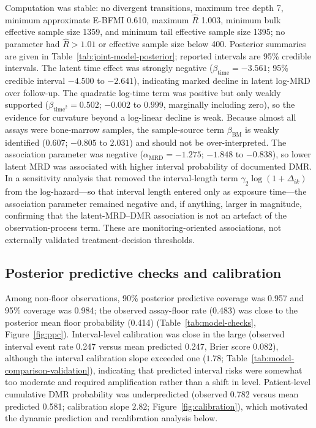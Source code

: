 \documentclass[11pt]{article}
\begin{document}
Computation was stable: no divergent transitions, maximum tree depth 7,
minimum approximate E-BFMI 0.610, maximum $\widehat{R}$ 1.003, minimum
bulk effective sample size 1359, and minimum tail effective sample size
1395; no parameter had $\widehat{R}>1.01$ or effective sample size below
400. Posterior summaries are given in
Table~\ref{tab:joint-model-posterior}; reported intervals are 95\% credible
intervals. The latent time effect was strongly negative
($\beta_{\mathrm{time}}=-3.561$; 95\% credible interval $-4.500$ to
$-2.641$), indicating marked decline in latent log-MRD over follow-up. The
quadratic log-time term was positive but only weakly supported
($\beta_{\mathrm{time}^2}=0.502$; $-0.002$ to $0.999$, marginally including
zero), so the evidence for curvature beyond a log-linear decline is weak.
Because almost all assays were bone-marrow samples, the sample-source term
$\beta_{\mathrm{BM}}$ is weakly identified ($0.607$; $-0.805$ to $2.031$) and
should not be over-interpreted. The association parameter was negative
($\alpha_{\mathrm{MRD}}=-1.275$; $-1.848$ to $-0.838$), so lower latent MRD
was associated with higher interval probability of documented DMR. In a
sensitivity analysis that removed the interval-length term
$\gamma_2\log(1+\Delta_{ik})$ from the log-hazard---so that interval length
entered only as exposure time---the association parameter remained negative
and, if anything, larger in magnitude, confirming that the latent-MRD--DMR
association is not an artefact of the observation-process term. These
are monitoring-oriented associations, not externally validated
treatment-decision thresholds.



\subsection{Posterior predictive checks and calibration}

Among non-floor observations, 90\% posterior predictive coverage was 0.957
and 95\% coverage was 0.984; the observed assay-floor rate (0.483) was
close to the posterior mean floor probability (0.414)
(Table~\ref{tab:model-checks}, Figure~\ref{fig:ppc}). Interval-level
calibration was close in the large (observed interval event rate 0.247
versus mean predicted 0.247, Brier score 0.082), although the interval
calibration slope exceeded one ($1.78$; Table~\ref{tab:model-comparison-validation}),
indicating that predicted interval risks were somewhat too moderate and
required amplification rather than a shift in level. Patient-level cumulative
DMR probability was underpredicted (observed 0.782 versus mean predicted
0.581; calibration slope $2.82$; Figure~\ref{fig:calibration}), which
motivated the dynamic prediction and recalibration analysis below.
\end{document}
